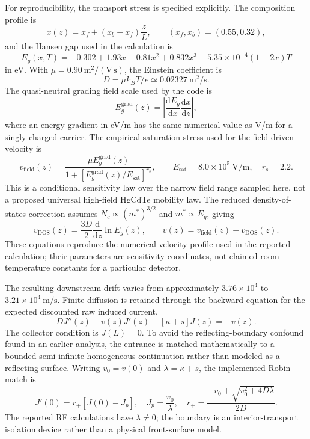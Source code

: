 \documentclass[11pt]{article}
\newcommand{\dd}{\mathrm{d}}
\begin{document}
For reproducibility, the transport stress is specified explicitly. The composition profile is
\begin{equation}
x(z)=x_f+(x_b-x_f)\frac{z}{L},\qquad (x_f,x_b)=(0.55,0.32),
\end{equation}
and the Hansen gap used in the calculation is
\begin{equation}
\boxed{E_g(x,T)=-0.302+1.93x-0.81x^2+0.832x^3+5.35\times10^{-4}(1-2x)T}
\label{eq:hansen_explicit}
\end{equation}
in eV. With $\mu=0.90~\mathrm{m^2/(V\,s)}$, the Einstein coefficient is
\begin{equation}
D=\mu k_BT/e\simeq0.02327~\mathrm{m^2/s}.
\end{equation}
The quasi-neutral grading field scale used by the code is
\begin{equation}
E_g^{\mathrm{grad}}(z)=\left|\frac{\dd E_g}{\dd x}\frac{\dd x}{\dd z}\right|,
\end{equation}
where an energy gradient in eV/m has the same numerical value as V/m for a singly charged carrier. The empirical saturation stress used for the field-driven velocity is
\begin{equation}
v_{\mathrm{field}}(z)=\frac{\mu E_g^{\mathrm{grad}}(z)}{1+[E_g^{\mathrm{grad}}(z)/E_{\mathrm{sat}}]^{r_s}},
\qquad E_{\mathrm{sat}}=8.0\times10^5~\mathrm{V/m},\quad r_s=2.2.
\label{eq:hg_vfield}
\end{equation}
This is a conditional sensitivity law over the narrow field range sampled here, not a proposed universal high-field HgCdTe mobility law. The reduced density-of-states correction assumes $N_c\propto(m^*)^{3/2}$ and $m^*\propto E_g$, giving
\begin{equation}
\boxed{v_{\mathrm{DOS}}(z)=\frac{3D}{2}\frac{\dd}{\dd z}\ln E_g(z),\qquad v(z)=v_{\mathrm{field}}(z)+v_{\mathrm{DOS}}(z).}
\label{eq:hg_velocity}
\end{equation}
These equations reproduce the numerical velocity profile used in the reported calculation; their parameters are sensitivity coordinates, not claimed room-temperature constants for a particular detector.

The resulting downstream drift varies from approximately $3.76\times10^4$ to $3.21\times10^4\ \mathrm{m/s}$. Finite diffusion is retained through the backward equation for the expected discounted raw induced current,
\begin{equation}
\boxed{
D J''(z)+v(z)J'(z)-[\kappa+s]J(z)=-v(z).}
\label{eq:hgbvp}
\end{equation}
The collector condition is $J(L)=0$. To avoid the reflecting-boundary confound found in an earlier analysis, the entrance is matched mathematically to a bounded semi-infinite homogeneous continuation rather than modeled as a reflecting surface. Writing $v_0=v(0)$ and $\lambda=\kappa+s$, the implemented Robin match is
\begin{equation}
\boxed{J'(0)=r_+[J(0)-J_p],\quad J_p=\frac{v_0}{\lambda},\quad r_+=\frac{-v_0+\sqrt{v_0^2+4D\lambda}}{2D}.}
\label{eq:hg_robin}
\end{equation}
The reported RF calculations have $\lambda\neq0$; the boundary is an interior-transport isolation device rather than a physical front-surface model.
\end{document}
